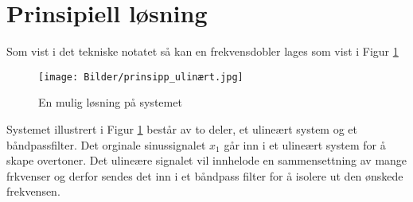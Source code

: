 \newpage
\section{Prinsipiell løsning}
\label{prinsipiellLoesning}

Som vist i det tekniske notatet \cite{Tek_notat} så kan en frekvensdobler lages som vist i Figur \ref{fig:prinsipp_ulinært}

\begin{figure}[!h]
    \centering  
    \texttt{[image: Bilder/prinsipp\_ulinært.jpg]}
    \caption{En mulig løsning på systemet}
    \label{fig:prinsipp_ulinært}

\end{figure}

Systemet illustrert i Figur \ref{fig:prinsipp_ulinært} består av to deler, et ulineært system og et båndpassfilter. Det orginale sinussignalet $x_1$ går inn i et ulineært system for å skape overtoner. Det ulineære signalet vil innhelode en sammensettning av mange frkvenser og derfor sendes det inn i et båndpass filter for å isolere ut den ønskede frekvensen.

